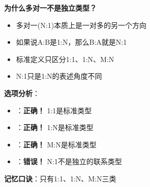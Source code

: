 \documentclass[12pt, a4paper]{article}
\newenvironment{bluebox}[1]{%
  \begin{trivlist}
  \item[\hskip\labelsep \textbf{#1}]
  \setlength{\parskip}{0.5ex}
  \setlength{\itemsep}{0.5ex}
}{%
  \end{trivlist}
  }
\begin{document}
\begin{bluebox}{例题12：不存在联系类型}
	\textbf{为什么多对一不是独立类型？}

	\begin{itemize}
		\item 多对一(N:1)本质上是一对多的另一个方向
		\item 如果说A:B是1:N，那么B:A就是N:1
		\item 标准定义只区分1:1、1:N、M:N
		\item N:1只是1:N的表述角度不同
	\end{itemize}

	\textbf{选项分析}：
	\begin{itemize}[nosep]
		\item[A) 一对一联系]：\textbf{正确！} 1:1是标准类型
		\item[B) 一对多联系]：\textbf{正确！} 1:N是标准类型
		\item[C) 多对多联系]：\textbf{正确！} M:N是标准类型
		\item[D) 多对一联系]：\textbf{错误！} N:1不是独立的联系类型
	\end{itemize}

	\textbf{记忆口诀}：只有1:1、1:N、M:N三类
\end{bluebox}
\end{document}

